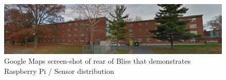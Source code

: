 \documentclass{article}
\begin{document}
                                                                                                                                                                                                                                                                                                                                                                                                                                                                                                                                                                                                                                                                                                         
		
		\begin{figure} [H]
				\begin{center}
					\includegraphics[scale=.3]{bliss.png}
						\captionsetup{labelformat=empty}
						\caption{Google Maps screen-shot of rear of Bliss that demonstrates Raspberry Pi / Sensor distribution}
				\end{center}
			\end{figure}
		
		
	\newpage
\end{document}

